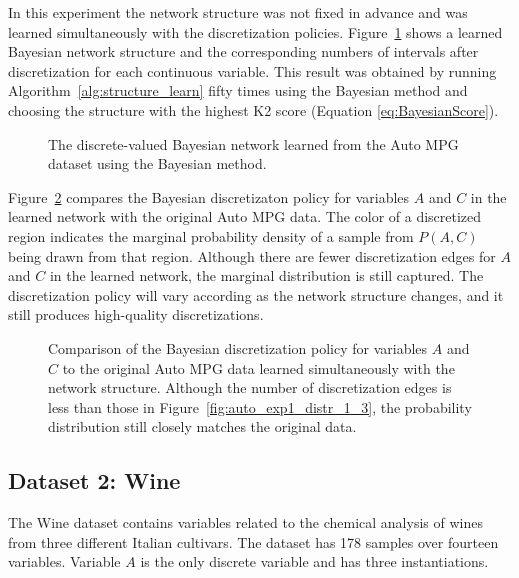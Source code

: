 In this experiment the network structure was not fixed in advance and was learned simultaneously with the discretization policies.
Figure~\ref{fig:auto_graph_2} shows a learned Bayesian network structure and the corresponding numbers of intervals after discretization for each continuous variable.
This result was obtained by running Algorithm~\ref{alg:structure_learn} fifty times using the Bayesian method and choosing the structure with the highest K2 score (Equation \ref{eq:BayesianScore}).

\begin{figure}[ht]
  \centering
  
  \caption{The discrete-valued Bayesian network learned from the Auto MPG dataset using the Bayesian method.}
  \label{fig:auto_graph_2}
\end{figure}

Figure~\ref{fig:auto_exp2_distr_1_3} compares the Bayesian discretizaton policy for variables $A$ and $C$ in the learned network with the original Auto MPG data.
The color of a discretized region indicates the marginal probability density of a sample from $P(A,C)$ being drawn from that region.
Although there are fewer discretization edges for $A$ and $C$ in the learned network, the marginal distribution is still captured.
The discretization policy will vary according as the network structure changes, and it still produces high-quality discretizations.

\begin{figure}[ht]
  \centering
  
  \caption{
    Comparison of the Bayesian discretization policy for variables $A$ and $C$ to the original Auto MPG data learned simultaneously with the network structure.
    Although the number of discretization edges is less than those in Figure~\ref{fig:auto_exp1_distr_1_3}, the probability distribution still closely matches the original data.
  }
  \label{fig:auto_exp2_distr_1_3}
\end{figure}

%
\subsection{Dataset 2: Wine}
\label{subsec:wine}

The Wine dataset contains variables related to the chemical analysis of wines from three different Italian cultivars.
The dataset has \num{178} samples over fourteen variables.
Variable $A$ is the only discrete variable and has three instantiations.

